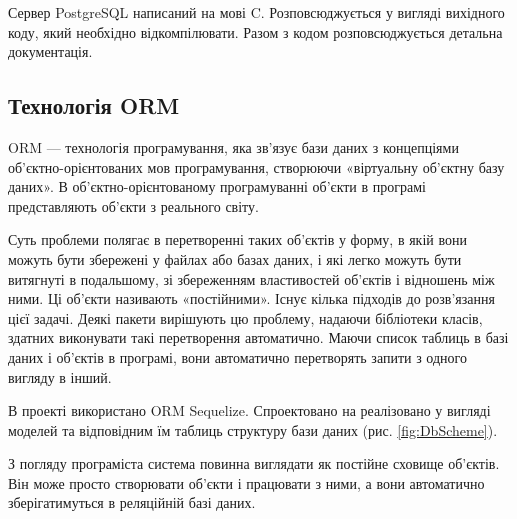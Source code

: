Сервер PostgreSQL написаний на мові C. Розповсюджується у вигляді вихідного коду, який необхідно відкомпілювати. Разом з кодом розповсюджується детальна документація.

\subsection{Технологія ORM}

ORM — технологія програмування, яка зв'язує бази даних з концепціями об'єктно-орієнтованих мов програмування, створюючи «віртуальну об'єктну базу даних». В об'єктно-орієнтованому програмуванні об'єкти в програмі представляють об'єкти з реального світу. 

Суть проблеми полягає в перетворенні таких об'єктів у форму, в якій вони можуть бути збережені у файлах або базах даних, і які легко можуть бути витягнуті в подальшому, зі збереженням властивостей об'єктів і відношень між ними. Ці об'єкти називають «постійними». Існує кілька підходів до розв'язання цієї задачі. Деякі пакети вирішують цю проблему, надаючи бібліотеки класів, здатних виконувати такі перетворення автоматично. Маючи список таблиць в базі даних і об'єктів в програмі, вони автоматично перетворять запити з одного вигляду в інший.

В проекті використано ORM Sequelize. Спроектовано на реалізовано у вигляді моделей та відповідним їм таблиць структуру бази даних (рис. \ref{fig:DbScheme}).


З погляду програміста система повинна виглядати як постійне сховище об'єктів. Він може просто створювати об'єкти і працювати з ними, а вони автоматично зберігатимуться в реляційній базі даних.
